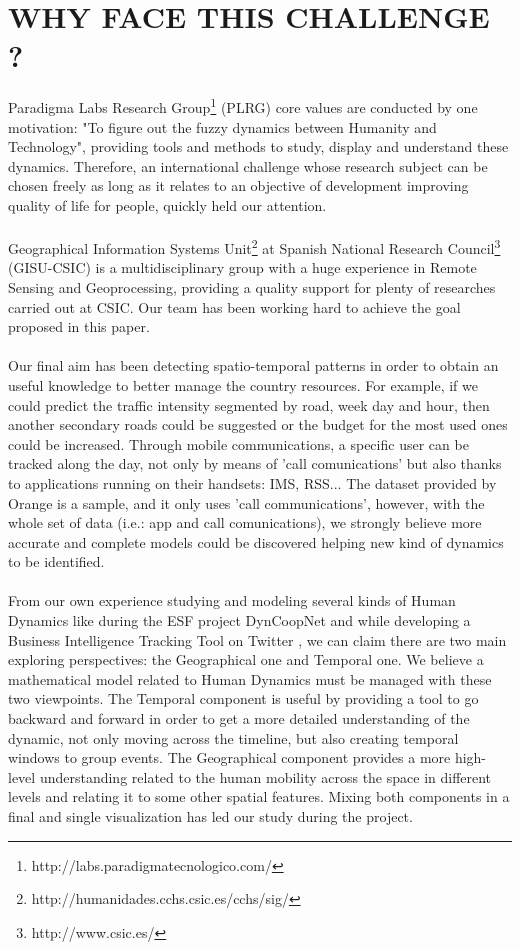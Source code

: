 \newpage

\section{WHY FACE THIS CHALLENGE ?}
Paradigma Labs Research Group\footnote{http://labs.paradigmatecnologico.com/} (PLRG) core values are conducted by one motivation: "To figure out the fuzzy dynamics between Humanity and Technology", providing tools and methods to study, display and understand these dynamics. Therefore, an international challenge whose research subject can be chosen freely as long as it relates to an objective of development improving quality of life for people, quickly held our attention.
\\
\\
Geographical Information Systems Unit\footnote{http://humanidades.cchs.csic.es/cchs/sig/} at Spanish National Research Council\footnote{http://www.csic.es/} (GISU-CSIC) is a multidisciplinary group with a huge experience in Remote Sensing and Geoprocessing, providing a quality support for plenty of researches carried out at CSIC. Our team has been working hard to achieve the goal proposed in this paper.
\\
\\
Our final aim has been detecting spatio-temporal patterns in order to obtain an useful knowledge to better manage the country resources. For example, if we could predict the traffic intensity segmented by road, week day and hour, then another secondary roads could be suggested or the budget for the most used ones could be increased. Through mobile communications, a specific user can be tracked along the day, not only by means of 'call comunications' but also thanks to applications running on their handsets: IMS, RSS... The dataset provided by Orange is a sample, and it only uses 'call communications', however, with the whole set of data (i.e.: app and call comunications), we strongly believe more accurate and complete models could be discovered helping new kind of dynamics to be identified.
\\
\\
From our own experience studying and modeling several kinds of Human Dynamics like during the ESF project DynCoopNet\citep{dyncoopnet2012} and while developing a Business Intelligence Tracking Tool on Twitter \citep{labselecciones}, we can claim there are two main exploring perspectives: the Geographical one and Temporal one. We believe a mathematical model related to Human Dynamics must be managed with these two viewpoints. The Temporal component is useful by providing a tool to go backward and forward in order to get a more detailed understanding of the dynamic, not only moving across the timeline, but also creating temporal windows to group events. The Geographical component provides a more high-level understanding related to the human mobility across the space in different levels and relating it to some other spatial features. Mixing both components in a final and single visualization has led our study during the project.
